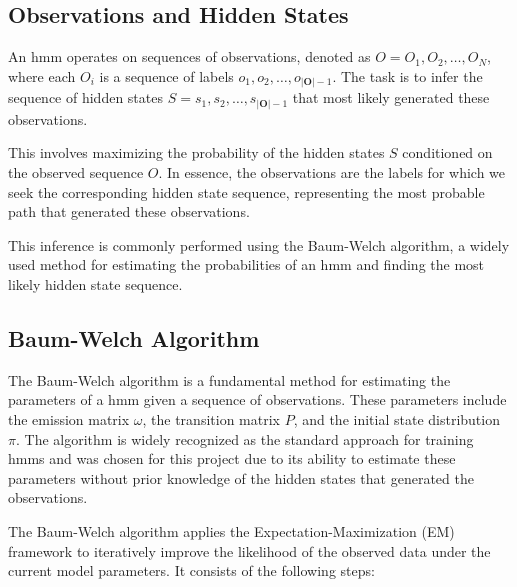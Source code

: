 \subsection{Observations and Hidden States}\label{subsec:observations-hidden-states}
An \gls{hmm} operates on sequences of observations, denoted as $O = {O_1, O_2, \ldots, O_N}$, where each $O_i$ is a sequence of labels $o_1, o_2, \ldots, o_{|\textbf{O}|-1}$.
The task is to infer the sequence of hidden states $S = s_1, s_2, \ldots, s_{|\textbf{O}|-1}$ that most likely generated these observations.

This involves maximizing the probability of the hidden states $S$ conditioned on the observed sequence $O$. In essence, the observations are the labels for which we seek the corresponding hidden state sequence, representing the most probable path that generated these observations.

This inference is commonly performed using the Baum-Welch algorithm, a widely used method for estimating the probabilities of an \gls{hmm} and finding the most likely hidden state sequence.

\subsection{Baum-Welch Algorithm}\label{subsec:baum-welch}
The Baum-Welch algorithm is a fundamental method for estimating the parameters of a \gls{hmm} given a sequence of observations. 
These parameters include the emission matrix $\omega$, the transition matrix $P$, and the initial state distribution $\pi$.
The algorithm is widely recognized as the standard approach for training \glspl{hmm} and was chosen for this project due to its ability to estimate these parameters without prior knowledge of the hidden states that generated the observations.

The Baum-Welch algorithm applies the Expectation-Maximization (EM) framework to iteratively improve the likelihood of the observed data under the current model parameters. It consists of the following steps:


